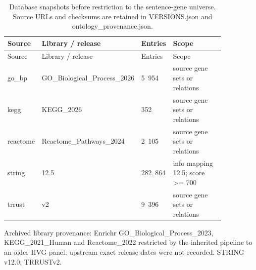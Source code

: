 \begin{longtable}{@{}L{0.13\linewidth}L{0.31\linewidth}L{0.12\linewidth}L{0.31\linewidth}@{}}
\caption{Database snapshots before restriction to the sentence-gene universe. Source URLs and checksums are retained in VERSIONS.json and ontology\_\allowbreak{}provenance.json.}\\
\toprule
Source & Library / release & Entries & Scope \\
\midrule
\endfirsthead
\toprule
Source & Library / release & Entries & Scope \\
\midrule
\endhead
\endfoot
\bottomrule
\endlastfoot
go\_\allowbreak{}bp & GO\_\allowbreak{}Biological\_\allowbreak{}Process\_\allowbreak{}2026 & 5~954 & source gene sets or relations \\
kegg & KEGG\_\allowbreak{}2026 & 352 & source gene sets or relations \\
reactome & Reactome\_\allowbreak{}Pathways\_\allowbreak{}2024 & 2~105 & source gene sets or relations \\
string & 12.5 & 282~864 & info mapping 12.5; score >= 700 \\
trrust & v2 & 9~396 & source gene sets or relations \\
\end{longtable}
\noindent Archived library provenance: Enrichr GO\_Biological\_Process\_2023, KEGG\_2021\_Human and Reactome\_2022 restricted by the inherited pipeline to an older HVG panel; upstream exact release dates were not recorded. STRING v12.0; TRRUSTv2.

